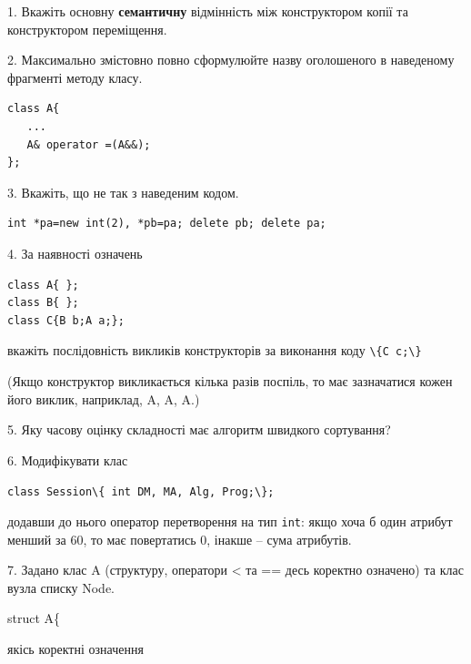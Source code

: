 \documentclass[12pt, ukrainian]{article}
\def\code#1{\Verb!#1!}
\begin{document}
{%
1. Вкажіть основну \textbf{семантичну} відмінність між конструктором копії та конструктором переміщення.%
\par
\vspace{2mm}
2. Максимально змістовно повно сформулюйте назву оголошеного в наведеному фрагменті методу класу.
\vspace{-3mm}
\begin{verbatim}class A{
   ...
   A& operator =(A&&);
};\end{verbatim}
\vspace{-3mm}
\par
\vspace{2mm}
3. Вкажіть, що не так з наведеним кодом.
\vspace{-3mm}
\begin{verbatim}int *pa=new int(2), *pb=pa; delete pb; delete pa;\end{verbatim}
\vspace{-3mm}
\par
\vspace{2mm}
4. За наявності означень
\vspace{-3mm}
\begin{verbatim}
class A{ };
class B{ };
class C{B b;A a;};\end{verbatim}
\vspace{-3mm}
вкажіть послідовність викликів конструкторів за виконання коду \code{\{C c;\}} 

(Якщо конструктор викликається кілька разів поспіль, то має зазначатися кожен його виклик, наприклад, A, A, A.)

\vspace{2mm}
5. Яку часову оцінку складності має алгоритм швидкого сортування?
\par
\vspace{2mm}
6. Модифікувати клас 

\qquad\code{class Session\{ int DM, MA, Alg, Prog;\};} 


додавши до нього оператор перетворення на тип \code{int}: якщо хоча б один атрибут менший за 60, то має повертатись 0, інакше -- сума атрибутів.%
\par
\vspace{2mm}
7. 
Задано клас A (структуру, оператори < та == десь коректно означено) та клас вузла списку Node.

struct A\{

\quad  якісь коректні означення 

}
\end{document}
